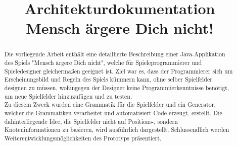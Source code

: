 \documentclass[conference]{IEEEtran}
\begin{document}
%
\title{Architekturdokumentation\\Mensch \"argere Dich nicht!}


\author{
\and
{}
}

\maketitle

\begin{abstract}
Die vorliegende Arbeit enth\"alt eine detaillierte Beschreibung einer Java-Applikation des Spiels "Mensch \"argere Dich nicht",
welche f\"ur Spieleprogrammierer und Spieledesigner gleicherma\ss en geeignet ist. Ziel war es, dass der Programmierer
sich um Erscheinungsbild und Regeln des Spiels k\"ummern kann, ohne selber Spielfelder designen zu m\"ussen, wohingegen der Designer keine
Programmierkenntnisse ben\"otigt, um neue Spielfelder hinzuzuf\"ugen und zu testen.\\ Zu diesem Zweck wurden eine Grammatik f\"ur die Spielfelder
und ein Generator, welcher die Grammatiken verarbeitet und automatisiert Code erzeugt, erstellt. Die dahinterliegende Idee, die Spielfelder
nicht auf Positions-, sondern Knoteninformationen zu basieren, wird ausf\"uhrlich dargestellt.
Schlussendlich werden Weiterentwicklungsm\"oglichkeiten des Prototyps pr\"asentiert.
\end{abstract}

\IEEEpeerreviewmaketitle
\end{document}
